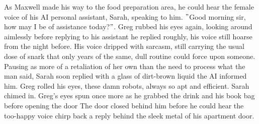 As Maxwell made his way to the food preparation area, he could hear the female voice of his AI personal assistant, Sarah, speaking to him.
\("\)Good morning sir, how may I be of assistance today?\("\).
Greg rubbed his eyes again, looking around aimlessly before replying to his assistant  he replied roughly, his voice still hoarse from the night before.
His voice dripped with sarcasm, still carrying the usual dose of snark that only years of the same, dull routine could force upon someone.
Pausing as more of a retaliation of her own than the need to process what the man said, Sarah soon replied with a glass of dirt-brown liquid 
the AI informed him.  Greg rolled his eyes, these damn robots, always so apt and efficient.
 Sarah chimed in. 
Greg’s eyes spun once more as he grabbed the drink and his book bag before opening the door 
The door closed behind him before he could hear the too-happy voice chirp back a reply behind the sleek metal of his apartment door.

\dinkus
